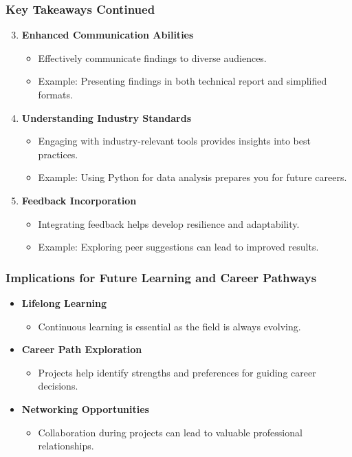 \documentclass{beamer}
\begin{document}
\begin{frame}[fragile]
    \frametitle{Key Takeaways Continued}
    \begin{enumerate}
        \setcounter{enumi}{2} %
        \item \textbf{Enhanced Communication Abilities}
        \begin{itemize}
            \item Effectively communicate findings to diverse audiences.
            \item Example: Presenting findings in both technical report and simplified formats.
        \end{itemize}

        \item \textbf{Understanding Industry Standards}
        \begin{itemize}
            \item Engaging with industry-relevant tools provides insights into best practices.
            \item Example: Using Python for data analysis prepares you for future careers.
        \end{itemize}

        \item \textbf{Feedback Incorporation}
        \begin{itemize}
            \item Integrating feedback helps develop resilience and adaptability.
            \item Example: Exploring peer suggestions can lead to improved results.
        \end{itemize}
    \end{enumerate}
\end{frame}

\begin{frame}[fragile]
    \frametitle{Implications for Future Learning and Career Pathways}
    \begin{itemize}
        \item \textbf{Lifelong Learning}
        \begin{itemize}
            \item Continuous learning is essential as the field is always evolving.
        \end{itemize}
        
        \item \textbf{Career Path Exploration}
        \begin{itemize}
            \item Projects help identify strengths and preferences for guiding career decisions.
        \end{itemize}
        
        \item \textbf{Networking Opportunities}
        \begin{itemize}
            \item Collaboration during projects can lead to valuable professional relationships.
        \end{itemize}
    \end{itemize}
\end{frame}
\end{document}
